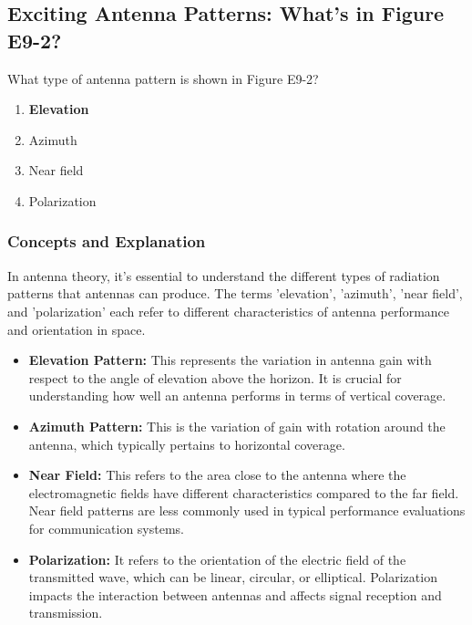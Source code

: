 \subsection{Exciting Antenna Patterns: What's in Figure E9-2?}

\begin{tcolorbox}[colback=gray!10, colframe=black, title=E9B05] What type of antenna pattern is shown in Figure E9-2? 
\begin{enumerate}[label=\Alph*.]
    \item \textbf{Elevation}
    \item Azimuth
    \item Near field
    \item Polarization
\end{enumerate} \end{tcolorbox}

\subsubsection{Concepts and Explanation}

In antenna theory, it's essential to understand the different types of radiation patterns that antennas can produce. The terms 'elevation', 'azimuth', 'near field', and 'polarization' each refer to different characteristics of antenna performance and orientation in space.

\begin{itemize}
    \item \textbf{Elevation Pattern:} This represents the variation in antenna gain with respect to the angle of elevation above the horizon. It is crucial for understanding how well an antenna performs in terms of vertical coverage.
    
    \item \textbf{Azimuth Pattern:} This is the variation of gain with rotation around the antenna, which typically pertains to horizontal coverage.
    
    \item \textbf{Near Field:} This refers to the area close to the antenna where the electromagnetic fields have different characteristics compared to the far field. Near field patterns are less commonly used in typical performance evaluations for communication systems.
    
    \item \textbf{Polarization:} It refers to the orientation of the electric field of the transmitted wave, which can be linear, circular, or elliptical. Polarization impacts the interaction between antennas and affects signal reception and transmission.
\end{itemize}

